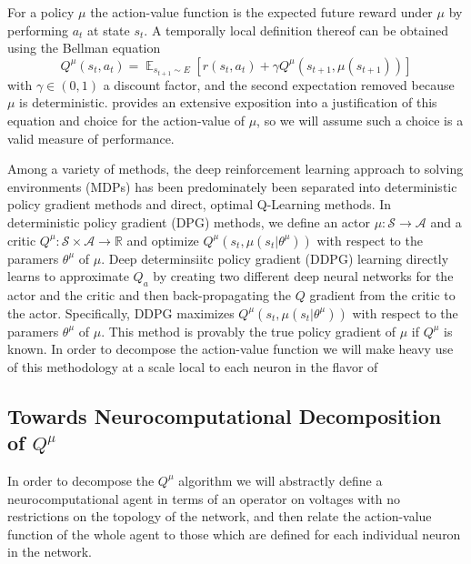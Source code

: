 \documentclass{article} %
\numberwithin{equation}{subsection}
\numberwithin{theorem}{subsection}
\def\expect{\mathop{{\mathbb{E}}}}
\theoremstyle{named}
\def\scripta{{\mathcal A}}
\def\scripts{{\mathcal S}}
\begin{document}
For a policy $\mu$  the action-value function is the expected future reward under $\mu$ by performing $a_t$ at state $s_t$. A temporally local definition thereof can be obtained using the Bellman equation
\begin{equation}
    Q^{\mu}(s_t, a_t) = \expect_{s_{t+1} \sim E}\left[r(s_{t}, a_t) + \gamma Q^{\mu}(s_{t+1}, \mu(s_{t+1}))\right]
\end{equation}
with $\gamma \in (0,1)$ a discount factor, and the second expectation removed because $\mu$ is deterministic.  provides an extensive exposition into a justification of this equation and choice for the action-value of $\mu$, so we will assume such a choice is a valid measure of performance.

Among a variety of methods, the deep reinforcement learning approach to solving environments (MDPs) has been predominately been separated into deterministic policy gradient methods and direct, optimal Q-Learning methods. In deterministic policy gradient (DPG) methods, we define an actor $\mu: \scripts \to \scripta$ and a critic $Q^\mu: \scripts \times \scripta \to \mathbb{R}$ and optimize $Q^\mu(s_t, \mu(s_t | \theta^{\mu}))$ with respect to the paramers $\theta^\mu$ of $\mu.$ Deep determinsiitc policy gradient (DDPG) learning directly learns to approximate $Q_a$ by creating two different deep neural networks for the actor and the critic and then back-propagating the $Q$ gradient from the critic to the actor. Specifically, DDPG maximizes $Q^\mu(s_t, \mu(s_t | \theta^{\mu}))$ with respect to the paramers $\theta^\mu$ of $\mu.$ This method is provably the true policy gradient of $\mu$ if $Q^\mu$ is known. In order to decompose the action-value function we will make heavy use of this methodology at a scale local to each neuron in the flavor of 

\subsection{Towards Neurocomputational Decomposition of $Q^\mu$}

In order to decompose the $Q^\mu$ algorithm we will abstractly define a neurocomputational agent in terms of an operator on voltages with no restrictions on the topology of the network, and then relate the action-value function of the whole agent to those which are defined for each individual neuron in the network.
\end{document}
